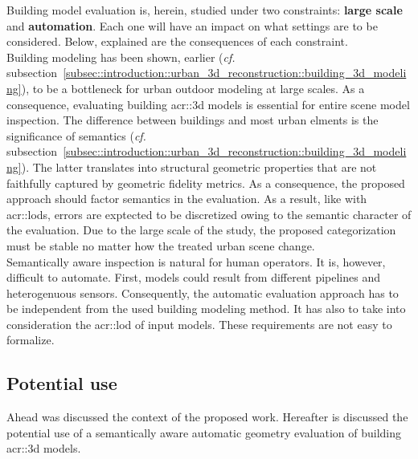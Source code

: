         Building model evaluation is, herein, studied under two constraints: \textbf{large scale} and \textbf{automation}.
        Each one will have an impact on what settings are to be considered.
        Below, explained are the consequences of each constraint.\\

        Building modeling has been shown, earlier (\textit{cf.} subsection~\ref{subsec::introduction::urban_3d_reconstruction::building_3d_modeling}), to be a bottleneck for urban outdoor modeling at large scales.
        As a consequence, evaluating building \gls{acr::3d} models is essential for entire scene model inspection.
        The difference between buildings and most urban elments is the significance of semantics (\textit{cf.} subsection~\ref{subsec::introduction::urban_3d_reconstruction::building_3d_modeling}).
        The latter translates into structural geometric properties that are not faithfully captured by geometric fidelity metrics.
        As a consequence, the proposed approach should factor semantics in the evaluation.
        As a result, like with \glspl{acr::lod}, errors are exptected to be discretized owing to the semantic character of the evaluation.
        Due to the large scale of the study, the proposed categorization must be stable no matter how the treated urban scene change.\\

        Semantically aware inspection is natural for human operators.
        It is, however, difficult to automate.
        First, models could result from different pipelines and heterogenuous sensors.
        Consequently, the automatic evaluation approach has to be independent from the used building modeling method.
        It has also to take into consideration the \gls{acr::lod} of input models.
        These requirements are not easy to formalize.

    \subsection{Potential use}
        \label{subsec::introduction::contributions::use}
        Ahead was discussed the context of the proposed work.
        Hereafter is discussed the potential use of a semantically aware automatic geometry evaluation of building \gls{acr::3d} models.
